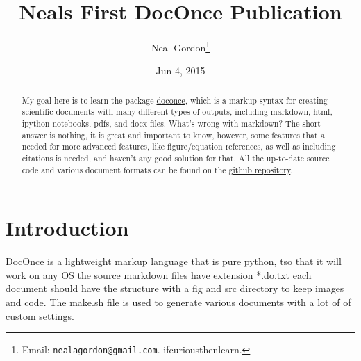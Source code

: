 \documentclass[%
twocolumn,
twoside,                 %
final,                   %
10pt]{article}
\begin{document}






\title{Neals First DocOnce Publication}


\author{Neal Gordon\footnote{Email: \texttt{nealagordon@gmail.com}. ifcuriousthenlearn.}}


\date{Jun 4, 2015}
\maketitle

\begin{abstract}
My goal here is to learn the package \href{{http://hplgit.github.io/doconce/doc/web/index.html}}{doconce}, which is a markup syntax for creating scientific documents with many different types of outputs, including markdown, html, ipython notebooks, pdfs, and docx files. What's wrong with markdown? The short answer is nothing, it is great and important to know, however, some features that a needed for more advanced features, like figure/equation references, as well as including citations is needed, and haven't any good solution for that. 
All the up-to-date source code and various document formats can be found on the \href{{https://github.com/nagordon/technotes/tree/master/doconce}}{github repository}.
\end{abstract}

\tableofcontents


\vspace{1cm} %




\section{Introduction}
\label{sec:intro}

DocOnce is a lightweight markup language that is pure python, tso that it will work on any OS
the source markdown files have extension *.do.txt
each document should have the structure with a fig and src directory to keep images and code. The make.sh file is used to generate various documents with a lot of of custom settings. 
\end{document}
